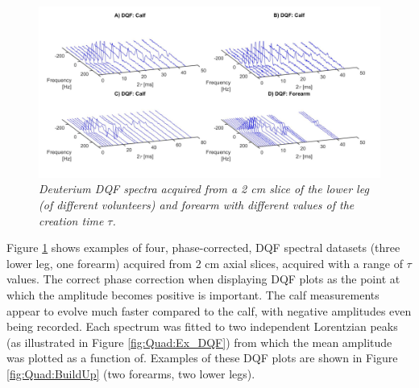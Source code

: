 \begin{figure}
    \centering
    \includegraphics[width=1\textwidth]{Figures/Quad/Bulk_DQF_1.png}
    \caption{\textit{Deuterium \ac{DQF} spectra acquired from a 2 cm slice of the lower leg (of different volunteers) and forearm with different values of the creation time $\tau$.}}
    \label{fig:Quad:Bulk_DQF_1}
\end{figure}

Figure \ref{fig:Quad:Bulk_DQF_1} shows examples of four, phase-corrected, \ac{DQF} spectral datasets (three lower leg, one forearm) acquired from 2 cm axial slices, acquired with a range of $\tau$ values. The correct phase correction when displaying \ac{DQF} plots as the point at which the amplitude becomes positive is important. The calf measurements appear to evolve much faster compared to the calf, with negative amplitudes even being recorded. Each spectrum was fitted to two independent Lorentzian peaks (as illustrated in Figure \ref{fig:Quad:Ex_DQF}) from which the mean amplitude was plotted as a function of. Examples of these \ac{DQF} plots are shown in Figure \ref{fig:Quad:BuildUp} (two forearms, two lower legs). 

